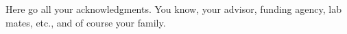 
Here go all your acknowledgments. You know, your advisor, funding agency, lab
mates, etc., and of course your family.

